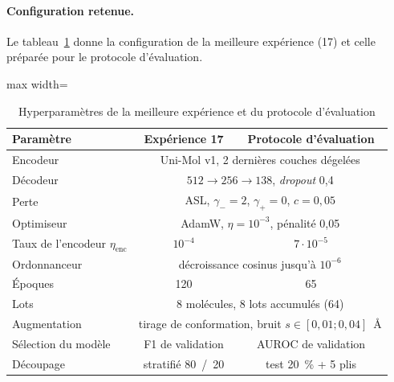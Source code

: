 \paragraph{Configuration retenue.}
Le tableau~\ref{tab:Hyperparametres} donne la configuration de la meilleure expérience (17) et celle préparée pour le protocole d'évaluation.

\begin{table}
   \centering
   \begin{adjustbox}{max width=\linewidth}
   \begin{tabular}{|l||c|c|}
      \hline
      Paramètre & Expérience 17 & Protocole d'évaluation \\
      \hline
      \hline
      Encodeur & \multicolumn{2}{c|}{Uni-Mol v1, 2 dernières couches dégelées} \\
      \hline
      Décodeur & \multicolumn{2}{c|}{$512 \rightarrow 256 \rightarrow 138$, \emph{dropout} 0,4} \\
      \hline
      Perte & \multicolumn{2}{c|}{ASL, $\gamma_- = 2$, $\gamma_+ = 0$, $c = 0{,}05$} \\
      \hline
      Optimiseur & \multicolumn{2}{c|}{AdamW, $\eta = 10^{-3}$, pénalité 0,05} \\
      \hline
      Taux de l'encodeur $\eta_{\mathrm{enc}}$ & $10^{-4}$ & $7 \cdot 10^{-5}$ \\
      \hline
      Ordonnanceur & \multicolumn{2}{c|}{décroissance cosinus jusqu'à $10^{-6}$} \\
      \hline
      Époques & 120 & 65 \\
      \hline
      Lots & \multicolumn{2}{c|}{8 molécules, 8 lots accumulés (64)} \\
      \hline
      Augmentation & \multicolumn{2}{c|}{tirage de conformation, bruit $s \in [0{,}01 ; 0{,}04]$~\AA} \\
      \hline
      Sélection du modèle & F1 de validation & AUROC de validation \\
      \hline
      Découpage & stratifié 80~/~20 & test 20~\% + 5 plis \\
      \hline
   \end{tabular}
   \end{adjustbox}
   \caption{Hyperparamètres de la meilleure expérience et du protocole d'évaluation}
   \label{tab:Hyperparametres}
\end{table}


